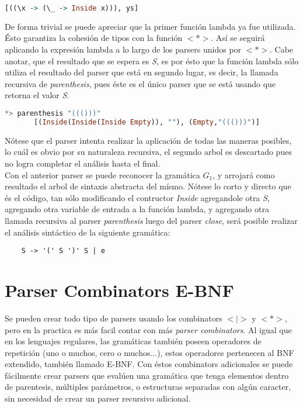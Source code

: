 \begin{exmp}
	\begin{lstlisting}[language=Haskell]
	[((\x -> (\_ -> Inside x))), ys]
	\end{lstlisting}
	
	De forma trivial se puede apreciar que la primer función lambda ya fue utilizada. Ésto garantiza la cohesión de tipos  con la función $<*>$. Así se seguirá aplicando la expresión lambda a lo largo de los parsers unidos por $<*>$. Cabe anotar, que el resultado que se espera es \emph{S}, es por ésto que la función lambda sólo utiliza el resultado del parser que está en segundo lugar, es decir, la llamada recursiva de \emph{parenthesis}, pues éste es el único parser que se está usando que retorna el valor \emph{S}. 
	
	\begin{lstlisting}[language=Haskell]
	*> parenthesis "((()))"
	   [(Inside(Inside(Inside Empty)), ""), (Empty,"((()))")]
	\end{lstlisting}
	
	Nótese que el parser intenta realizar la aplicación de todas las maneras posibles, lo cuál es obvio por su naturaleza recursiva, el segundo arbol es descartado pues no logra completar el análisis hasta el final.\\
	
	Con el anterior parser se puede reconocer la gramática $G_1$, y arrojará como resultado el arbol de sintaxis abstracta del mísmo. Nótese lo corto y directo que és el código, tan sólo modificando el contructor \emph{Inside} agregandole otra \emph{S}, agregando otra variable de entrada a la función lambda, y agregando otra llamada recursiva al parser \emph{parenthesis} luego del parser \emph{close}, será posible realizar el análisis sintáctico de la siguiente gramática:
	
	\begin{lstlisting}
	S -> '(' S ')' S | e
	\end{lstlisting}
	
\end{exmp}

\section{Parser Combinators E-BNF}
Se pueden crear todo tipo de parsers usando los combinators $<|>$ y $<*>$, pero en la practica es más facil contar con más \emph{parser combinators}. Al igual que en los lenguajes regulares, las gramáticas también poseen operadores de repetición (uno o muchos, cero o muchos...), estos operadores pertenecen al BNF extendido, también llamado E-BNF. Con éstos combinators adicionales se puede fácilmente crear parsers que evalúen una gramática que tenga elementos dentro de parentesis, múltiples parámetros, o estructuras separadas con algún caracter, sin necesidad de crear un parser recursivo adicional.

